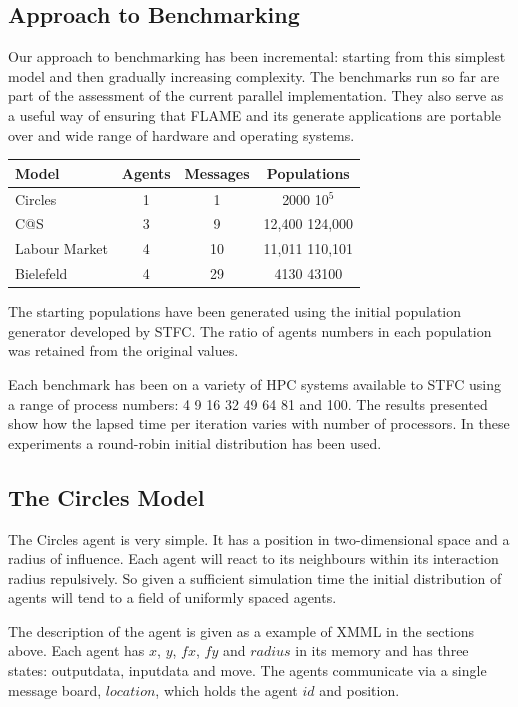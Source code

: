 \subsection{Approach to Benchmarking}
Our approach to benchmarking has been incremental: starting from this simplest model and then gradually increasing complexity. The benchmarks run so far are part of the assessment of the current parallel implementation. They also serve as a useful way of ensuring that FLAME and its generate applications are portable over and wide range of hardware and operating systems. 

\begin{table}[ht]
	\centering
		\begin{tabular}{l|ccc}
		Model 				& Agents & Messages & Populations 		\\\hline
		Circles  			&   1    &   1      &  2000 10$^5$   	\\
		C@S  					&   3    &   9      &  12,400 124,000 \\
		Labour Market &   4    &   10     &  11,011 110,101 \\ 
		Bielefeld	    &   4    &   29     &  4130 43100     \\\hline
		\end{tabular}
\end{table}

The starting populations have been generated using the initial population generator developed by STFC. The ratio of agents numbers in each population was retained from the original values.

Each benchmark has been on a variety of HPC systems available to STFC using a range of process numbers: 4 9 16 32 49 64 81 and 100. The results presented show how the lapsed time per iteration varies with number of processors. In these experiments a round-robin initial distribution has been used.
\subsection{The Circles Model}
The Circles agent is very simple. It has a position in two-dimensional space and a radius of influence. Each agent will react to its neighbours within its interaction radius repulsively. So given a sufficient simulation time the initial distribution of agents will tend to a field of uniformly spaced agents.

The description of the agent is given as a example of XMML in the sections above. Each agent has $x$, $y$, $fx$, $fy$ and $radius$ in its memory and has three states: outputdata, inputdata and move. The agents communicate via a single message board, $location$, which holds the agent $id$ and position.


